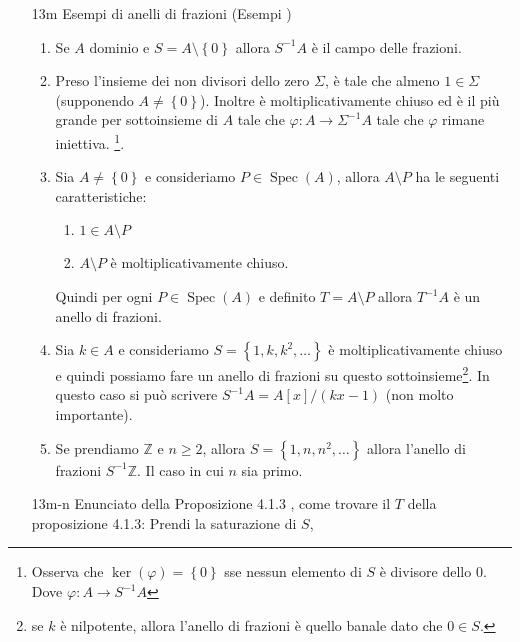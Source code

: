 \documentclass[italian]{article}
\begin{document}
	\begin{enumerate}
      \item[13m] Esempi di anelli di frazioni (Esempi \cite{vergura})
        \begin{enumerate}
          \item Se $A$ dominio e $S = A \setminus \left\{ 0 \right\}$ allora
            $S^{-1}A$ è il campo delle frazioni.
          \item Preso l'insieme dei non divisori dello zero $\Sigma$, 
            è tale che almeno $1 \in \Sigma$ (supponendo $A \neq \left\{ 
            0 \right\}$). Inoltre è moltiplicativamente chiuso ed è il più grande
            per sottoinsieme di $A$ tale che $\varphi \colon A \to \Sigma^{-1}A$
            tale che $\varphi$ rimane iniettiva.
            \footnote{Osserva che $\ker(\varphi) = \left\{ 0 \right\}$ 
            sse nessun elemento di $S$ è divisore dello $0$. Dove $\varphi 
            \colon A \to S^{-1}A$}.
          \item Sia $A \neq \left\{ 0 \right\}$ e consideriamo $P \in 
            \operatorname{Spec}(A)$, allora $A \setminus P$ ha le seguenti
            caratteristiche:
            \begin{enumerate}
                \item $1 \in A \setminus P$
                \item $A \setminus P$ è moltiplicativamente chiuso.
            \end{enumerate}
            Quindi per ogni $P \in \operatorname{Spec}(A)$ e definito $T
            = A \setminus P$ allora $T^{-1}A$ è un anello di frazioni.
          \item Sia $ k \in A$ e consideriamo $S = \left\{ 1, k, k^2, \dots
            \right\}$ è moltiplicativamente chiuso e quindi possiamo fare un
            anello di frazioni su questo sottoinsieme\footnote{se $k$
            è nilpotente, allora l'anello di frazioni è quello banale dato che
            $0 \in S$.}. In questo caso si può scrivere $S^{-1}A = A\left[ x
            \right] / (kx - 1)$ (non molto importante). 
          \item Se prendiamo $\mathbb{Z}$ e $n \ge 2$, allora $S = \left\{1, n, n^2,
            \dots\right\}$ allora l'anello di frazioni $S^{-1}\mathbb{Z}$. Il
            caso in cui $n$ sia primo. 
         \end{enumerate}
       \item[13m-n] Enunciato della Proposizione 4.1.3 \cite{vergura}, come
         trovare il $T$ della proposizione 4.1.3: Prendi la saturazione di $S$,

\end{enumerate}
\end{document}
